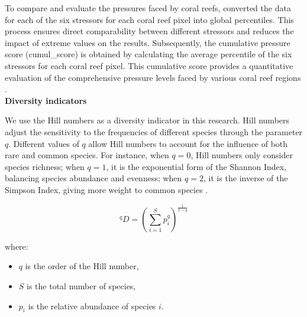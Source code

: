 \documentclass[a4paper, 11]{article}
\begin{document}
To compare and evaluate the pressures faced by coral reefs, \citet{andrello2022global} converted the data for each of the six stressors for each coral reef pixel into global percentiles. This process ensures direct comparability between different stressors and reduces the impact of extreme values on the results. Subsequently, the cumulative pressure score (cumul\_score) is obtained by calculating the average percentile of the six stressors for each coral reef pixel. This cumulative score provides a quantitative evaluation of the comprehensive pressure levels faced by various coral reef regions \citep{andrello2022global}.\\


\noindent\textbf{Diversity indicators}

We use the Hill numbers as a diversity indicator in this research. Hill numbers adjust the sensitivity to the frequencies of different species through the parameter \( q \). Different values of \( q \) allow Hill numbers to account for the influence of both rare and common species. For instance, when \( q = 0 \), Hill numbers only consider species richness; when \( q = 1 \), it is the exponential form of the Shannon Index, balancing species abundance and evenness; when \( q = 2 \), it is the inverse of the Simpson Index, giving more weight to common species \cite{jost2006entropy}.

\begin{equation}
    {^q}D = \left( \sum_{i=1}^{S} p_i^q \right)^{\frac{1}{1-q}}
\end{equation}

where:
\begin{itemize}
    \item $q$ is the order of the Hill number,
    \item $S$ is the total number of species,
    \item $p_i$ is the relative abundance of species $i$.
\end{itemize}
\end{document}
